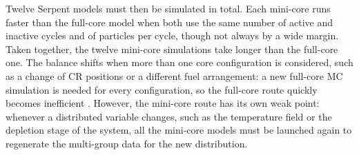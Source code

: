 Twelve Serpent models must then be simulated in total. Each mini-core runs faster than the full-core model when both use the same number of active and inactive cycles and of particles per cycle, though not always by a wide margin. Taken together, the twelve mini-core simulations take longer than the full-core one. The balance shifts when more than one core configuration is considered, such as a change of CR positions or a different fuel arrangement: a new full-core MC simulation is needed for every configuration, so the full-core route quickly becomes inefficient \cite{SPH_computational_time}. However, the mini-core route has its own weak point: whenever a distributed variable changes, such as the temperature field or the depletion stage of the system, all the mini-core models must be launched again to regenerate the multi-group data for the new distribution.

